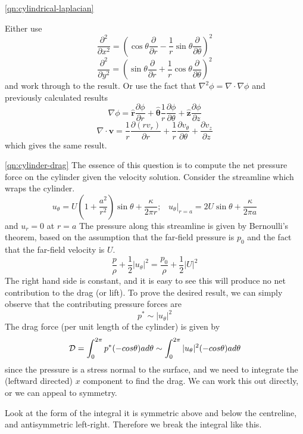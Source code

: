 \documentclass[10pt]{report}
\begin{document}
\begin{answer7}
\begin{questionnumber}{\ref{qn:cylindrical-laplacian}}
	\newcommand{\pd}[2]{\frac{\partial {#1} }{\partial {#2}}}
	\newcommand{\ppd}[2]{\frac{\partial^{2} {#1} }{\partial {#2}^{2}}}
	\newcommand{\pppd}[2]{\frac{\partial^{3} {#1} }{\partial {#2}^{3}}}
	\newcommand{\ppdd}[3]{\frac{\partial^{2} {#1} }{\partial {#2} \partial {#3}}}

	Either use
	\[
		\ppd{ }{x} = \left( \cos\theta \pd{ }{r} -
				\frac{1}{r}\sin\theta \pd{ }{\theta} \right)^{2}
	\]
	\[
		\ppd{ }{y} = \left( \sin\theta \pd{ }{r} +
				\frac{1}{r}\cos\theta \pd{ }{\theta} \right)^{2}
	\]
	and work through to the result.
	Or use the fact that $\nabla^{2}\phi = \nabla\cdot\nabla \phi$
	and previously calculated results
	\[
		\nabla\phi = \hat{\bm r}\pd{\phi}{r} +
		\hat{\bm \theta}\frac{1}{r}\pd{\phi}{\theta} + \hat{\bm z}\pd{\phi}{z}
	\]
	\[
		\nabla\cdot {\bm v} = \frac{1}{r}\pd{(r v_{r})}{r} +
							\frac{1}{r}\pd{ v_{\theta}}{\theta} + \pd{v_{z}}{z}
	\]
	which gives the same result.
\end{questionnumber}

\begin{questionnumber}{\ref{qn:cylinder-drag}}
	The essence of this question is to compute the net pressure force on the cylinder
	given the velocity solution. Consider the streamline which wraps the cylinder.
	\[
		u_{\theta} = U\left( 1+\frac{a^{2}}{r^{2}}\right) \sin\theta +
		              \frac{\kappa}{2\pi r}; \;\;\;
	    \left. u_{{\theta}}\right|_{r=a} = 2U\sin\theta +
		              \frac{\kappa}{2\pi a}
	\]
	and $u_{r} = 0$ at $r=a$
	The pressure along this streamline is given by Bernoulli's theorem,
	based on the assumption that the far-field pressure is $p_{0}$ and
	the fact that the far-field velocity is $U$.
	\[
		\frac{p}{\rho} + \frac{1}{2}|u_{\theta}|^{2} =
		\frac{p_{0}}{\rho} + \frac{1}{2}|U|^{2}
	\]
	The right hand side is constant, and it is easy to see this will produce no
	net contribution to the drag (or lift). To prove the desired result, we can
	simply observe that the contributing pressure forces are
	\[
		p^{*} \sim |u_{\theta}|^{2}
	\]
	The drag force (per unit length of the cylinder) is given by
	\[
		{\cal D} = \int_{0}^{2\pi} p^{*} (-cos\theta) a d\theta \sim
					\int_{0}^{2\pi} |u_{\theta}|^{2} (-cos\theta) a d\theta
	\]
	since the pressure is a stress normal to the surface, and we need to integrate
	the (leftward directed) $x$ component to find the drag. We can work this out directly,
	or we can appeal to symmetry.

	Look at the form of the integral it is symmetric above and below the centreline, and antisymmetric
	left-right. Therefore we break the integral like this.


\end{questionnumber}
\end{answer7}
\end{document}
